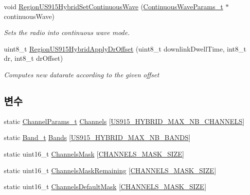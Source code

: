 \begin{DoxyCompactItemize}
void \mbox{\hyperlink{group___r_e_g_i_o_n_u_s915_h_y_b_gad7b0e2c75aff473cd0c4287d4c6f24d1}{Region\+U\+S915\+Hybrid\+Set\+Continuous\+Wave}} (\mbox{\hyperlink{group___r_e_g_i_o_n_gaf39bb5ba06921139c6d17f88a8d518cd}{Continuous\+Wave\+Params\+\_\+t}} $\ast$continuous\+Wave)
\begin{DoxyCompactList}\small\item\em Sets the radio into continuous wave mode. \end{DoxyCompactList}\item 
uint8\+\_\+t \mbox{\hyperlink{group___r_e_g_i_o_n_u_s915_h_y_b_gaa90275764dd76f7122c3253d2eab2c2f}{Region\+U\+S915\+Hybrid\+Apply\+Dr\+Offset}} (uint8\+\_\+t downlink\+Dwell\+Time, int8\+\_\+t dr, int8\+\_\+t dr\+Offset)
\begin{DoxyCompactList}\small\item\em Computes new datarate according to the given offset \end{DoxyCompactList}\end{DoxyCompactItemize}
\subsection*{변수}
\begin{DoxyCompactItemize}
\item 
static \mbox{\hyperlink{group___l_o_r_a_m_a_c_ga1360ca6f82c6d125ea43a9dad9b56184}{Channel\+Params\+\_\+t}} \mbox{\hyperlink{_region_u_s915-_hybrid_8c_a2781ea69a73fdddcc54719ec4775751f}{Channels}} \mbox{[}\mbox{\hyperlink{group___r_e_g_i_o_n_u_s915_h_y_b_ga977b73cbf7a5d15e2bf543fad5f35710}{U\+S915\+\_\+\+H\+Y\+B\+R\+I\+D\+\_\+\+M\+A\+X\+\_\+\+N\+B\+\_\+\+C\+H\+A\+N\+N\+E\+LS}}\mbox{]}
\item 
static \mbox{\hyperlink{group___l_o_r_a_m_a_c_ga8f49721ee96ceb52c80a896ab11a2ed8}{Band\+\_\+t}} \mbox{\hyperlink{_region_u_s915-_hybrid_8c_acdf8c87a5e1e73b468dbf151f92e2273}{Bands}} \mbox{[}\mbox{\hyperlink{group___r_e_g_i_o_n_u_s915_h_y_b_ga1ddb8622d642ac6254b04f9020ccfcf7}{U\+S915\+\_\+\+H\+Y\+B\+R\+I\+D\+\_\+\+M\+A\+X\+\_\+\+N\+B\+\_\+\+B\+A\+N\+DS}}\mbox{]}
\item 
static uint16\+\_\+t \mbox{\hyperlink{_region_u_s915-_hybrid_8c_a2188957b5ca6af8092154d7ccbfa5757}{Channels\+Mask}} \mbox{[}\mbox{\hyperlink{_region_u_s915-_hybrid_8c_a1b20a8de3ae59c0b063fb313f0c70890}{C\+H\+A\+N\+N\+E\+L\+S\+\_\+\+M\+A\+S\+K\+\_\+\+S\+I\+ZE}}\mbox{]}
\item 
static uint16\+\_\+t \mbox{\hyperlink{_region_u_s915-_hybrid_8c_a567333cec639a004655cc1717e9d0928}{Channels\+Mask\+Remaining}} \mbox{[}\mbox{\hyperlink{_region_u_s915-_hybrid_8c_a1b20a8de3ae59c0b063fb313f0c70890}{C\+H\+A\+N\+N\+E\+L\+S\+\_\+\+M\+A\+S\+K\+\_\+\+S\+I\+ZE}}\mbox{]}
\item 
static uint16\+\_\+t \mbox{\hyperlink{_region_u_s915-_hybrid_8c_ac127b19779301713d5ed92eb03366a2d}{Channels\+Default\+Mask}} \mbox{[}\mbox{\hyperlink{_region_u_s915-_hybrid_8c_a1b20a8de3ae59c0b063fb313f0c70890}{C\+H\+A\+N\+N\+E\+L\+S\+\_\+\+M\+A\+S\+K\+\_\+\+S\+I\+ZE}}\mbox{]}
\end{DoxyCompactItemize}


